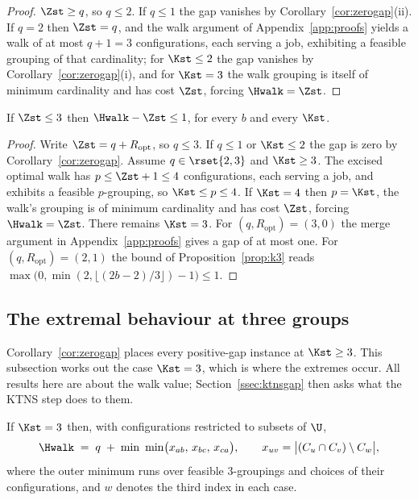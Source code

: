 \begin{proof}
$\Zst\ge q$, so $q\le2$. If $q\le1$ the gap vanishes by
Corollary~\ref{cor:zerogap}(ii). If $q=2$ then $\Zst=q$, and the walk argument of
Appendix~\ref{app:proofs} yields a walk of at most $q+1=3$ configurations, each
serving a job, exhibiting a feasible grouping of that cardinality; for $\Kst\le2$ the
gap vanishes by Corollary~\ref{cor:zerogap}(i), and for $\Kst=3$ the walk grouping is
itself of minimum cardinality and has cost $\Zst$, forcing $\Hwalk=\Zst$.
\end{proof}

\begin{corollary}\label{cor:z3}
If $\Zst\le3$ then $\Hwalk-\Zst\le1$, for every $b$ and every $\Kst$.
\end{corollary}

\begin{proof}
Write $\Zst=q+R_{\mathrm{opt}}$, so $q\le3$. If $q\le1$ or $\Kst\le2$ the gap is zero
by Corollary~\ref{cor:zerogap}. Assume $q\in\rset{2,3}$ and $\Kst\ge3$. The excised
optimal walk has $p\le\Zst+1\le4$ configurations, each serving a job, and exhibits a
feasible $p$-grouping, so $\Kst\le p\le4$. If $\Kst=4$ then $p=\Kst$, the walk's
grouping is of minimum cardinality and has cost $\Zst$, forcing $\Hwalk=\Zst$. There
remains $\Kst=3$. For $(q,R_{\mathrm{opt}})=(3,0)$ the merge argument in
Appendix~\ref{app:proofs} gives a gap of at most one. For
$(q,R_{\mathrm{opt}})=(2,1)$ the bound of Proposition~\ref{prop:k3} reads
$\max\bigl(0,\min(2,\lfloor(2b-2)/3\rfloor)-1\bigr)\le1$.
\end{proof}

\subsection{The extremal behaviour at three groups}\label{ssec:law}

Corollary~\ref{cor:zerogap} places every positive-gap instance at $\Kst\ge3$. This
subsection works out the case $\Kst=3$, which is where the extremes occur. All
results here are about the walk value; Section~\ref{ssec:ktnsgap} then asks what the
KTNS step does to them.

\begin{proposition}[Exact walk cost at $\Kst=3$]\label{prop:hk3}
If $\Kst=3$ then, with configurations restricted to subsets of $\U$,
\[
  \Hwalk\;=\;q\;+\;\min\ \min\bigl(x_{ab},\,x_{bc},\,x_{ca}\bigr),
  \qquad x_{uv}=\bigl\lvert(C_u\cap C_v)\setminus C_w\bigr\rvert,
\]
where the outer minimum runs over feasible $3$-groupings and choices of their
configurations, and $w$ denotes the third index in each case.
\end{proposition}

